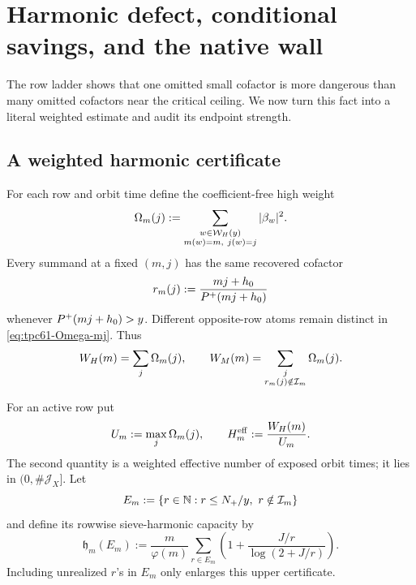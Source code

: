 \section{Harmonic defect, conditional savings, and the native wall}
\label{sec:tpc61-harmonic-defect}

The row ladder shows that one omitted small cofactor is more dangerous than
many omitted cofactors near the critical ceiling.  We now turn this fact
into a literal weighted estimate and audit its endpoint strength.

\subsection{A weighted harmonic certificate}

For each row and orbit time define the coefficient-free high weight
\begin{equation}
 \Omega_m(j)
 :=\sum_{\substack{w\in\mathcal W_H(y)\\m(w)=m,\ j(w)=j}}
       |\beta_w|^2.
 \label{eq:tpc61-Omega-mj}
\end{equation}
Every summand at a fixed \((m,j)\) has the same recovered cofactor
\begin{equation}
 r_m(j):=\frac{mj+h_0}{P^{+}(mj+h_0)}
 \label{eq:tpc61-realized-row-cofactor}
\end{equation}
whenever \(P^{+}(mj+h_0)>y\).  Different opposite-row atoms remain
distinct in
\eqref{eq:tpc61-Omega-mj}.  Thus
\begin{equation}
 W_H(m)=\sum_j\Omega_m(j),
 \qquad
 W_M(m)=\sum_{\substack{j\\r_m(j)\notin\mathcal I_m}}\Omega_m(j).
 \label{eq:tpc61-row-weight-orbit-form}
\end{equation}

For an active row put
\begin{equation}
 U_m:=\max_j\Omega_m(j),
 \qquad
 H_m^{\rm eff}:=\frac{W_H(m)}{U_m}.
 \label{eq:tpc61-effective-high-exposure}
\end{equation}
The second quantity is a weighted effective number of exposed orbit times;
it lies in \((0,\#\mathcal J_X]\).  Let
\begin{equation}
 E_m:=\{r\in\N:r\le N_+/y,\ r\notin\cI_m\}
 \label{eq:tpc61-missing-cofactor-set}
\end{equation}
and define its rowwise sieve-harmonic capacity by
\begin{equation}
 \mathfrak h_m(E_m)
 :=\frac m{\varphi(m)}
   \sum_{r\in E_m}
   \left(
    1+\frac{J/r}{\log(2+J/r)}
   \right).
 \label{eq:tpc61-harmonic-defect}
\end{equation}
Including unrealized \(r\)'s in \(E_m\) only enlarges this upper
certificate.


